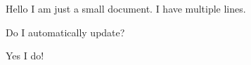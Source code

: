 \documentclass{article}
\begin{document}
Hello I am just a small document.
I have multiple lines.

Do I automatically update?

Yes I do!
\end{document}

